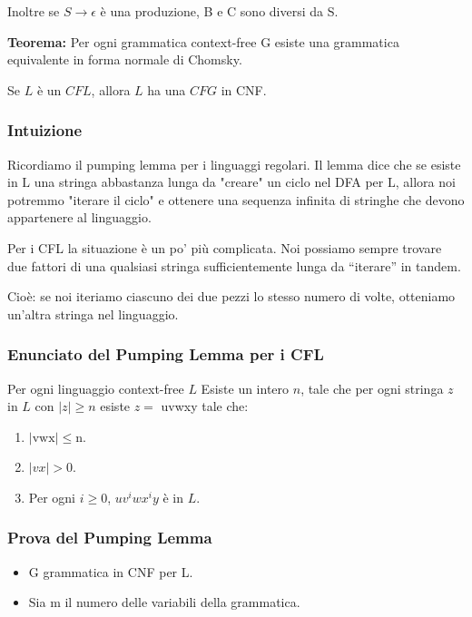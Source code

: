 Inoltre se $S \rightarrow \epsilon$ è una produzione, B e
C sono diversi da S.

\vspace{5mm}

\textbf{Teorema:} Per ogni grammatica context-free $\mathrm{G}$ esiste una grammatica equivalente in forma normale di Chomsky.

Se $L$ è un $C F L$, allora $L$ ha una $C F G$ in CNF.

\subsubsection{Intuizione}

Ricordiamo il pumping lemma per i linguaggi regolari. Il lemma dice che se esiste in $\mathrm{L}$ una stringa abbastanza lunga da "creare" un ciclo nel DFA per $\mathrm{L}$, allora noi potremmo "iterare il ciclo" e ottenere una sequenza infinita di stringhe che devono appartenere al linguaggio.

Per i CFL la situazione è un po’ più complicata. Noi possiamo sempre trovare due fattori di una qualsiasi stringa sufficientemente lunga da “iterare” in tandem.

Cioè: se noi iteriamo ciascuno dei due
pezzi lo stesso numero di volte, otteniamo
un’altra stringa nel linguaggio.

\subsubsection{Enunciato del Pumping Lemma per i CFL}

Per ogni linguaggio context-free $L$
Esiste un intero $n$, tale che per ogni stringa $z$ in $L$ con $|z| \geq n$
esiste $z=$ uvwxy tale che:
\begin{enumerate}
    \item $|\mathrm{vwx}| \leq \mathrm{n}$.
    \item $|v x|>0$.
    \item Per ogni $i \geq 0$, $uv^{i}wx^{i}y$ è in $L$.
\end{enumerate}

\subsubsection{Prova del Pumping Lemma}
\begin{itemize}
    \item G grammatica in CNF per L.
    \item Sia m il numero delle variabili della grammatica.
\end{itemize}

